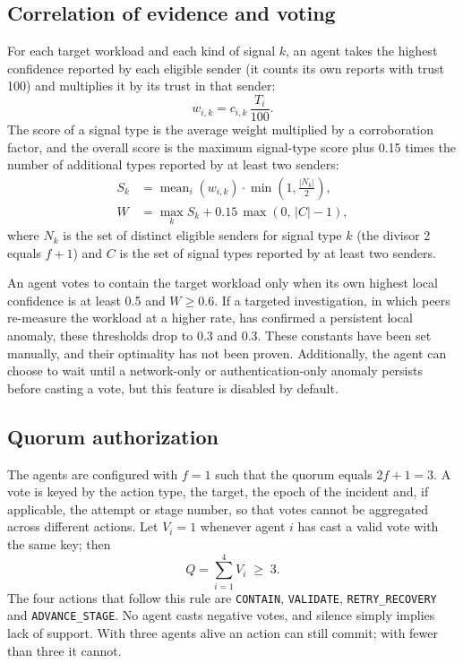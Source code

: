 \documentclass[journal]{IEEEtran}
\newcommand{\action}[1]{\texttt{#1}}
\begin{document}
\subsection{Correlation of evidence and voting}
For each target workload and each kind of signal $k$, an agent takes the highest confidence reported by each eligible sender (it counts its own reports with trust 100) and multiplies it by its trust in that sender:
\begin{equation}
w_{i,k}=c_{i,k}\,\frac{T_i}{100}.
\label{eq:weight}
\end{equation}
The score of a signal type is the average weight multiplied by a corroboration factor, and the overall score is the maximum signal-type score plus 0.15 times the number of additional types reported by at least two senders:
\begin{align}
S_k &= \operatorname{mean}_i(w_{i,k})\cdot\min\!\left(1,\tfrac{|N_k|}{2}\right),\label{eq:sk}\\
W   &= \max_k S_k + 0.15\,\max(0,\,|C|-1),\label{eq:W}
\end{align}
where $N_k$ is the set of distinct eligible senders for signal type $k$ (the divisor 2 equals $f+1$) and $C$ is the set of signal types reported by at least two senders.

An agent votes to contain the target workload only when its own highest local confidence is at least 0.5 and $W\ge 0.6$. If a targeted investigation, in which peers re-measure the workload at a higher rate, has confirmed a persistent local anomaly, these thresholds drop to 0.3 and 0.3. These constants have been set manually, and their optimality has not been proven. Additionally, the agent can choose to wait until a network-only or authentication-only anomaly persists before casting a vote, but this feature is disabled by default.

\subsection{Quorum authorization}
The agents are configured with $f=1$ such that the quorum equals $2f+1=3$. A vote is keyed by the action type, the target, the epoch of the incident and, if applicable, the attempt or stage number, so that votes cannot be aggregated across different actions. Let $V_i=1$ whenever agent $i$ has cast a valid vote with the same key; then
\begin{equation}
Q=\sum_{i=1}^{4}V_i\;\ge\;3.
\label{eq:quorum}
\end{equation}
The four actions that follow this rule are \action{CONTAIN}, \action{VALIDATE}, \action{RETRY\_RECOVERY} and \action{ADVANCE\_STAGE}. No agent casts negative votes, and silence simply implies lack of support. With three agents alive an action can still commit; with fewer than three it cannot.
\end{document}
